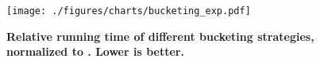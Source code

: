 \begin{figure}[t]
  \centering
  \texttt{[image: ./figures/charts/bucketing\_exp.pdf]}
  \caption{\textbf{
  Relative running time of different bucketing strategies, normalized to \HBS{}. Lower is better.}
  }\label{fig:bucketing-exp}
\end{figure} 